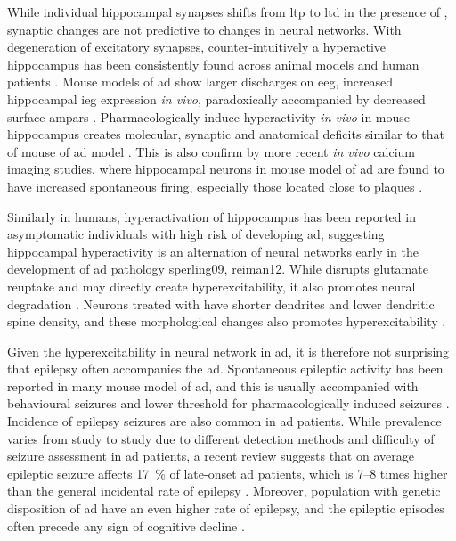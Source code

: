 While individual hippocampal synapses shifts from \gls{ltp} to \gls{ltd} in the presence of \abeta{}, synaptic changes are not predictive to changes in neural networks. With degeneration of excitatory synapses, counter-intuitively a hyperactive hippocampus has been consistently found across animal models and human patients \citep{palop16}. Mouse models of \gls{ad} show larger discharges on \gls{eeg}, increased hippocampal \gls{ieg} expression \textit{in vivo}, paradoxically accompanied by decreased surface \glspl{ampar} \citep{palop07, harris10, born14}. Pharmacologically induce hyperactivity \textit{in vivo} in mouse hippocampus creates molecular, synaptic and anatomical deficits similar to that of mouse of \gls{ad} model \citep{palop07}. This is also confirm by more recent \textit{in vivo} calcium imaging studies, where hippocampal neurons in mouse model of \gls{ad} are found to have increased spontaneous firing, especially those located close to plaques \citep{busche12}. 

Similarly in humans, hyperactivation of hippocampus has been reported in asymptomatic individuals with high risk of developing \gls{ad}, suggesting hippocampal hyperactivity is an alternation of neural networks early in the development of \gls{ad} pathology {sperling09, reiman12}. While \abeta{} disrupts glutamate reuptake and may directly create hyperexcitability, it also promotes neural degradation \citep{spires04, koffie09}. Neurons treated with \abeta{} have shorter dendrites and lower dendritic spine density, and these morphological changes also promotes hyperexcitability \citep{siskova14}.

Given the hyperexcitability in neural network in \gls{ad}, it is therefore not surprising that epilepsy often accompanies the \gls{ad}. Spontaneous epileptic activity has been reported in many mouse model of \gls{ad}, and this is usually accompanied with behavioural seizures and lower threshold for pharmacologically induced seizures \citep{palop07, um12, ittner10}. Incidence of epilepsy seizures are also common in \gls{ad} patients. While prevalence varies from study to study due to different detection methods and difficulty of seizure assessment in \gls{ad} patients, a recent review suggests that on average epileptic seizure affects \SI{17}{\percent} of late-onset \gls{ad} patients, which is 7--8 times higher than the general incidental rate of epilepsy \citep{amatniek06, horvath16}. Moreover, population with genetic disposition of \gls{ad} have an even higher rate of epilepsy, and the epileptic episodes often precede any sign of cognitive decline \citep{moehlmann02,cabrejo06,mcnaughton12}. 

